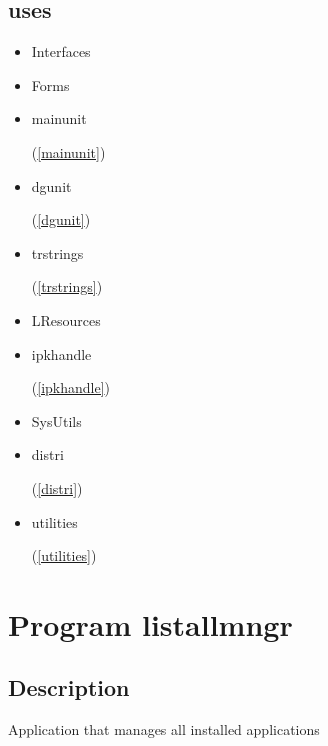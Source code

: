 \documentclass{report}
\begin{document}
\section{uses}
\begin{itemize}
\item \begin{ttfamily}Interfaces\end{ttfamily}\item \begin{ttfamily}Forms\end{ttfamily}\item \begin{ttfamily}mainunit\end{ttfamily}(\ref{mainunit})\item \begin{ttfamily}dgunit\end{ttfamily}(\ref{dgunit})\item \begin{ttfamily}trstrings\end{ttfamily}(\ref{trstrings})\item \begin{ttfamily}LResources\end{ttfamily}\item \begin{ttfamily}ipkhandle\end{ttfamily}(\ref{ipkhandle})\item \begin{ttfamily}SysUtils\end{ttfamily}\item \begin{ttfamily}distri\end{ttfamily}(\ref{distri})\item \begin{ttfamily}utilities\end{ttfamily}(\ref{utilities})\end{itemize}
\chapter{Program listallmngr}
\label{listallmngr}
\section{Description}
Application that manages all installed applications
\end{document}
